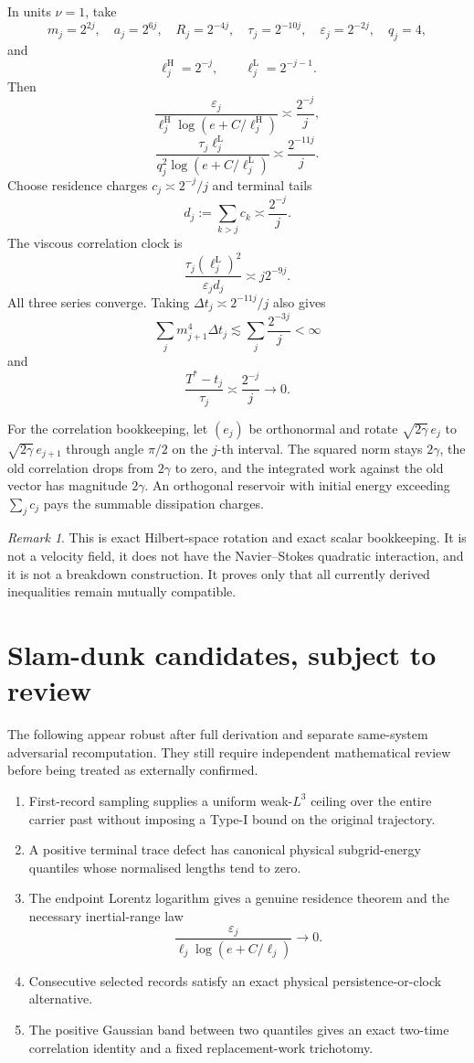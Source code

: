\documentclass[11pt]{article}
\theoremstyle{definition}
\theoremstyle{remark}
\newtheorem{remark}[theorem]{Remark}
\newcommand{\eps}{\varepsilon}
\begin{document}
In units \(\nu=1\), take
\[
 m_j=2^{2j},\quad
 a_j=2^{6j},\quad
 R_j=2^{-4j},\quad
 \tau_j=2^{-10j},\quad
 \eps_j=2^{-2j},\quad q_j=4,
\]
and
\[
 \ell_j^{\mathrm H}=2^{-j},
 \qquad
 \ell_j^{\mathrm L}=2^{-j-1}.
\]
Then
\[
 \frac{\eps_j}
 {\ell_j^{\mathrm H}\log(e+C/\ell_j^{\mathrm H})}
 \asymp\frac{2^{-j}}j,
\]
\[
 \frac{\tau_j\ell_j^{\mathrm L}}
 {q_j^2\log(e+C/\ell_j^{\mathrm L})}
 \asymp\frac{2^{-11j}}j.
\]
Choose residence charges \(c_j\asymp2^{-j}/j\) and terminal tails
\[
 d_j:=\sum_{k>j}c_k\asymp\frac{2^{-j}}j.
\]
The viscous correlation clock is
\[
 \frac{\tau_j(\ell_j^{\mathrm L})^2}{\eps_jd_j}
 \asymp j2^{-9j}.
\]
All three series converge.  Taking
\(\Delta t_j\asymp2^{-11j}/j\) also gives
\[
 \sum_jm_{j+1}^4\Delta t_j
 \lesssim\sum_j\frac{2^{-3j}}j<\infty
\]
and
\[
 \frac{T^*-t_j}{\tau_j}\asymp\frac{2^{-j}}j\to0.
\]

For the correlation bookkeeping, let \((e_j)\) be orthonormal and rotate
\(\sqrt{2\gamma}\,e_j\) to \(\sqrt{2\gamma}\,e_{j+1}\) through angle
\(\pi/2\) on the \(j\)-th interval.  The squared norm stays \(2\gamma\), the
old correlation drops from \(2\gamma\) to zero, and the integrated work
against the old vector has magnitude \(2\gamma\).  An orthogonal reservoir
with initial energy exceeding \(\sum_jc_j\) pays the summable dissipation
charges.

\begin{remark}
This is exact Hilbert-space rotation and exact scalar bookkeeping.  It is not
a velocity field, it does not have the Navier--Stokes quadratic interaction,
and it is not a breakdown construction.  It proves only that all currently
derived inequalities remain mutually compatible.
\end{remark}

\section{Slam-dunk candidates, subject to review}

The following appear robust after full derivation and separate same-system
adversarial recomputation.  They still require independent mathematical
review before being treated as externally confirmed.

\begin{enumerate}
\item First-record sampling supplies a uniform weak-\(L^3\) ceiling over the
entire carrier past without imposing a Type-I bound on the original
trajectory.
\item A positive terminal trace defect has canonical physical
subgrid-energy quantiles whose normalised lengths tend to zero.
\item The endpoint Lorentz logarithm gives a genuine residence theorem and
the necessary inertial-range law
\[
 \frac{\eps_j}{\ell_j\log(e+C/\ell_j)}\to0.
\]
\item Consecutive selected records satisfy an exact physical
persistence-or-clock alternative.
\item The positive Gaussian band between two quantiles gives an exact
two-time correlation identity and a fixed replacement-work trichotomy.
\end{enumerate}
\end{document}
